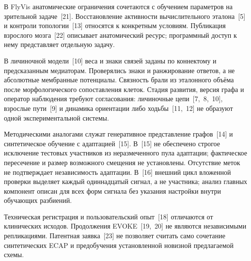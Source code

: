 \documentclass[12pt,a4paper]{article}
\begin{document}
В FlyVis анатомические ограничения сочетаются с обучением параметров на зрительной задаче~\mbox{[21]}. Восстановление активности вычислительного эталона~\mbox{[5]} и контроли топологии~\mbox{[13]} относятся к конкретным условиям. Публикация взрослого мозга~\mbox{[22]} описывает анатомический ресурс; программный доступ к нему представляет отдельную задачу.\par
В личиночной модели~\mbox{[10]} веса и знаки связей заданы по коннектому и предсказанным медиаторам. Проверялись знаки и ранжирование ответов, а не абсолютные мембранные потенциалы. Связность брали из эталонного объёма после морфологического сопоставления клеток. Стадия развития, версия графа и оператор наблюдения требуют согласования: личиночные цепи~\mbox{[7, 8, 10]}, взрослые пути~\mbox{[9]} и динамика ориентации либо ходьбы~\mbox{[11, 12]} не образуют одной экспериментальной системы.\par
Методическими аналогами служат генеративное представление графов~\mbox{[14]} и синтетическое обучение с адаптацией~\mbox{[15]}. В~\mbox{[15]} не обеспечено строгое исключение тестовых участников из неразмеченного пула адаптации; фактическое пересечение и размер возможного смещения не установлены. Отсутствие меток не подтверждает независимость адаптации. В~\mbox{[16]} внешний цикл вложенной проверки выделяет каждый одиннадцатый сигнал, а не участника; анализ главных компонент описан для всех форм сигнала без указания настройки внутри обучающих разбиений.\par
Техническая регистрация и пользовательский опыт~\mbox{[18]} отличаются от клинических исходов. Продолжения EVOKE~\mbox{[19, 20]} не являются независимыми репликациями. Патентная заявка~\mbox{[23]} не позволяет считать само сочетание синтетических ECAP и предобучения установленной новизной предлагаемой схемы.\par
\end{document}

